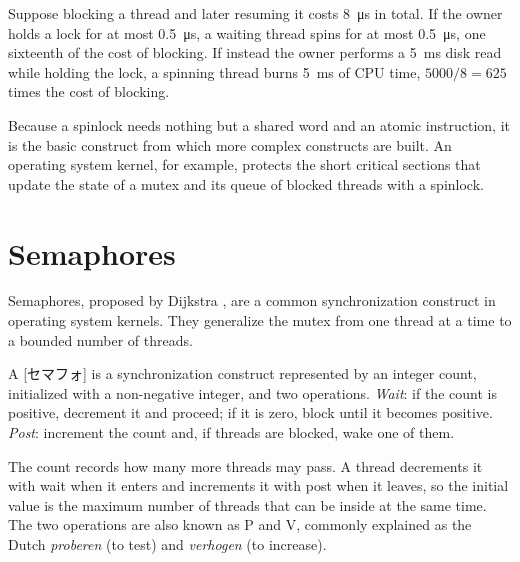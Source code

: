 \documentclass[../main.tex]{subfiles}
\begin{document}
\begin{example}
  Suppose blocking a thread and later resuming it costs \SI{8}{\micro\second}
  in total.  If the owner holds a lock for at most
  \SI{0.5}{\micro\second}, a waiting thread spins for at most
  \SI{0.5}{\micro\second}, one sixteenth of the cost of blocking.  If
  instead the owner performs a \SI{5}{\milli\second} disk read while
  holding the lock, a spinning thread burns \SI{5}{\milli\second} of CPU
  time, $5000/8 = 625$ times the cost of blocking.
\end{example}

Because a spinlock needs nothing but a shared word and an atomic
instruction, it is the basic construct from which more complex constructs
are built.  An operating system kernel, for example, protects the short
critical sections that update the state of a mutex and its queue of
blocked threads with a spinlock.

\section{Semaphores}
\label{sec:l10-semaphore}

Semaphores, proposed by Dijkstra \cite{dijkstra1965}, are a common
synchronization construct in operating system kernels.  They generalize the mutex from one thread at a time to a bounded
number of threads.

\begin{definition}[Semaphore]
  A [セマフォ] is a synchronization construct represented
  by an integer count, initialized with a non-negative integer, and two
  operations.  \emph{Wait}: if the count is positive, decrement it and
  proceed; if it is zero, block until it becomes positive.  \emph{Post}:
  increment the count and, if threads are blocked, wake one of them.
\end{definition}

The count records how many more threads may pass.  A thread decrements it
with wait when it enters and increments it with post when it leaves, so
the initial value is the maximum number of threads that can be inside at
the same time.  The two operations are also known as P and V, commonly
explained as the Dutch \emph{proberen} (to test) and \emph{verhogen} (to
increase).
\end{document}
